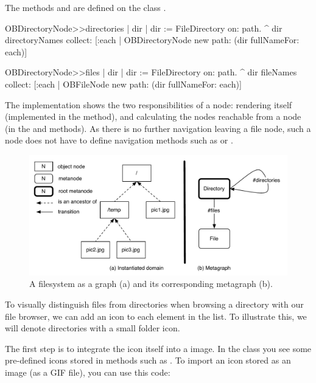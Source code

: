 \documentclass[a4paper,10pt,twoside]{book}
\begin{document}
The methods  and  are defined on the class .

\begin{code}{}
OBDirectoryNode>>directories
     | dir | 
     dir := FileDirectory on: path.
     ^ dir directoryNames collect: [:each | 
                                  OBDirectoryNode new path: (dir fullNameFor: each)]

OBDirectoryNode>>files
     | dir | 
     dir := FileDirectory on:  path.
     ^ dir fileNames collect: [:each | 
                            OBFileNode new path: (dir fullNameFor: each)]
\end{code}

The implementation shows the two responsibilities of a node: rendering itself (implemented in the  method), and calculating the nodes reachable from a node (in the  and  methods). As there is no further navigation leaving a file node, such a node does not have to define navigation methods such as  or .

\begin{figure}[!ht]
\begin{center}
\includegraphics[scale=0.55]{metagraph-fs.pdf}
\caption{A filesystem as a graph (a) and its corresponding metagraph (b).} 
\end{center}
\end{figure}

To visually distinguish files from directories when browsing a directory with our file browser, we can add an icon to each element in the list. To illustrate this, we will denote directories with a small folder icon. 

The first step is to integrate the icon itself into a \pharo image. In the class  you see some pre-defined icons stored in methods such as . To import an icon stored as an image (\eg as a GIF file), you can use this code:
\end{document}
